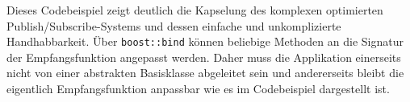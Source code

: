Dieses Codebeispiel zeigt deutlich die Kapselung des komplexen optimierten Publish/\-Subscribe-Systems und dessen einfache und unkomplizierte Handhabbarkeit. Über \texttt{boost::bind} können beliebige Methoden an die Signatur der Empfangsfunktion angepasst werden. Daher muss die Applikation einerseits nicht von einer abstrakten Basisklasse abgeleitet sein und andererseits bleibt die eigentlich Empfangsfunktion anpassbar wie es im Codebeispiel dargestellt ist.




